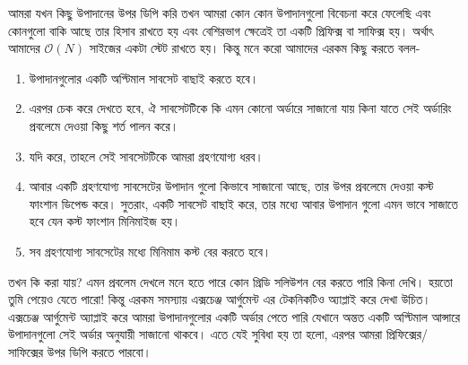 আমরা যখন কিছু উপাদানের উপর ডিপি করি তখন আমরা কোন কোন উপাদানগুলো বিবেচনা করে ফেলেছি এবং কোনগুলো বাকি আছে তার হিসাব রাখতে হয় এবং বেশিরভাগ ক্ষেত্রেই তা একটি প্রিফিক্স বা সাফিক্স হয়। অর্থাৎ আমাদের $\mathcal{O}(N)$ সাইজের একটা স্টেট রাখতে হয়। কিন্তু মনে করো আমাদের এরকম কিছু করতে বলল-
\begin{enumerate}
  \item উপাদানগুলোর একটি অপ্টিমাল সাবসেট বাছাই করতে হবে।
  \item এরপর চেক করে দেখতে হবে, ঐ সাবসেটটিকে কি এমন কোনো অর্ডারে সাজানো যায় কিনা যাতে সেই অর্ডারিং প্রবলেমে দেওয়া কিছু শর্ত পালন করে।
  \item যদি করে, তাহলে সেই সাবসেটটিকে আমরা গ্রহণযোগ্য ধরব।
  \item আবার একটি গ্রহণযোগ্য সাবসেটের উপাদান গুলো কিভাবে সাজানো আছে, তার উপর প্রবলেমে দেওয়া কস্ট ফাংশান ডিপেন্ড করে। সুতরাং, একটি সাবসেট বাছাই করে, তার মধ্যে আবার উপাদান গুলো এমন ভাবে সাজাতে হবে যেন কস্ট ফাংশান মিনিমাইজ হয়।
  \item সব গ্রহণযোগ্য সাবসেটের মধ্যে মিনিমাম কস্ট বের করতে হবে।
\end{enumerate}
তখন কি করা যায়? এমন প্রবলেম দেখলে মনে হতে পারে কোন গ্রিডি সলিউশন বের করতে পারি কিনা দেখি। হয়তো তুমি পেয়েও যেতে পারো! কিন্তু এরকম সমস্যায় এক্সচেঞ্জ আর্গুমেন্ট এর টেকনিকটিও অ্যাপ্লাই করে দেখা উচিত। এক্সচেঞ্জ আর্গুমেন্ট অ্যাপ্লাই করে আমরা উপাদানগুলোর একটি অর্ডার পেতে পারি যেখানে অন্তত একটি অপ্টিমাল আন্সারে উপাদানগুলো সেই অর্ডার অনুযায়ী সাজানো থাকবে। এতে যেই সুবিধা হয় তা হলো, এরপর আমরা প্রিফিক্সের/সাফিক্সের উপর ডিপি করতে পারবো।

